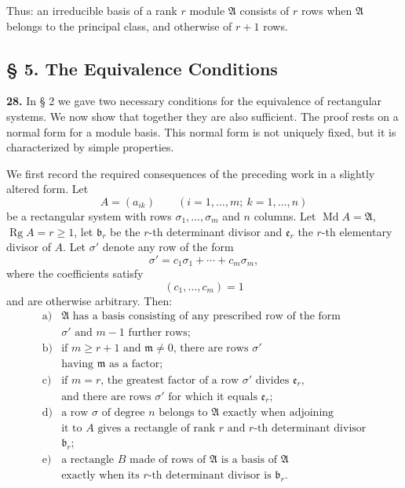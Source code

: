 \documentclass[11pt,a4paper]{article}
\begin{document}
Thus: an irreducible basis of a rank \(r\) module \(\mathfrak A\) consists of \(r\) rows when \(\mathfrak A\) belongs to the principal class, and otherwise of \(r+1\) rows.

\subsection*{§ 5. The Equivalence Conditions}

\textbf{28.} In § 2 we gave two necessary conditions for the equivalence of rectangular systems. We now show that together they are also sufficient. The proof rests on a normal form for a module basis. This normal form is not uniquely fixed, but it is characterized by simple properties.

We first record the required consequences of the preceding work in a slightly altered form. Let
\[
 A=(a_{ik})\qquad(i=1,\ldots,m;\ k=1,\ldots,n)
\]
be a rectangular system with rows \(\sigma_1,\ldots,\sigma_m\) and \(n\) columns. Let \(\operatorname{Md}A=\mathfrak A\), \(\operatorname{Rg}A=r\ge1\), let \(\mathfrak b_r\) be the \(r\)-th determinant divisor and \(\mathfrak e_r\) the \(r\)-th elementary divisor of \(A\). Let \(\sigma'\) denote any row of the form
\[
 \sigma'=c_1\sigma_1+\cdots+c_m\sigma_m,
\]
where the coefficients satisfy
\[
 (c_1,\ldots,c_m)=1 \tag{31}
\]
and are otherwise arbitrary. Then:
\[
\begin{array}{ll}
\text{a)}&\text{\(\mathfrak A\) has a basis consisting of any prescribed row of the form}\\
&\text{\(\sigma'\) and \(m-1\) further rows;}\\
\text{b)}&\text{if \(m\ge r+1\) and \(\mathfrak m\ne0\), there are rows \(\sigma'\)}\\
&\text{having \(\mathfrak m\) as a factor;}\\
\text{c)}&\text{if \(m=r\), the greatest factor of a row \(\sigma'\) divides \(\mathfrak e_r\),}\\
&\text{and there are rows \(\sigma'\) for which it equals \(\mathfrak e_r\);}\\
\text{d)}&\text{a row \(\sigma\) of degree \(n\) belongs to \(\mathfrak A\) exactly when adjoining}\\
&\text{it to \(A\) gives a rectangle of rank \(r\) and \(r\)-th determinant divisor}\\
&\text{\(\mathfrak b_r\);}\\
\text{e)}&\text{a rectangle \(B\) made of rows of \(\mathfrak A\) is a basis of \(\mathfrak A\)}\\
&\text{exactly when its \(r\)-th determinant divisor is \(\mathfrak b_r\).}
\end{array}
\]
\end{document}
